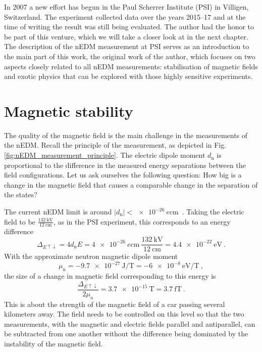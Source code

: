 In 2007 a new effort has begun in the Paul Scherrer Institute (PSI) in Villigen, Switzerland. The experiment collected data over the years 2015--17 and at the time of writing the result was still being evaluated. The author had the honor to be part of this venture, which we will take a closer look at in the next chapter. The description of the nEDM measurement at PSI serves as an introduction to the main part of this work, the original work of the author, which focuses on two aspects closely related to all nEDM measurements: stabilisation of magnetic fields and exotic physics that can be explored with those highly sensitive experiments.



\section{Magnetic stability}
The quality of the magnetic field is the main challenge in the measurements of the nEDM\@. Recall the principle of the measurement, as depicted in Fig.\,\ref{fig:nEDM_measurement_principle}. The electric dipole moment $d_\text{n}$ is proportional to the difference in the measured energy separations between the field configurations. Let us ask ourselves the following question: How big is a change in the magnetic field that causes a comparable change in the separation of the states?

The current nEDM limit is around $|d_\text{n}| < \SI{e-26}{\elementarycharge\centi\meter}$~\cite{PhysRevLett.97.131801}. Taking the electric field to be $\frac{ \SI{132}{\kilo\volt} }{ \SI{12}{\centi\meter} }$, as in the PSI experiment, this corresponds to an energy difference
\begin{equation}
  \Delta_{E\uparrow\downarrow} = 4 d_\text{n} E = \SI{4e-26}{\elementarycharge\centi\meter} \ \frac{ \SI{132}{\kilo\volt} }{ \SI{12}{\centi\meter} } = \SI{4.4e-22}{\electronvolt} \ .
\end{equation}
With the approximate neutron magnetic dipole moment~\cite{PDG2016}
\begin{equation}
  \mu_\text{n} = \SI{-9.7e-27}{\joule\per\tesla} = \SI{-6e-8}{\electronvolt\per\tesla} \ ,
\end{equation}
the size of a change in magnetic field corresponding to this energy is
\begin{equation}
  \frac{ \Delta_{E\uparrow\downarrow} }{2 \mu_n} = \SI{3.7e-15}{\tesla} = \SI{3.7}{\femto\tesla} \ .
\end{equation}
This is about the strength of the magnetic field of a car passing several kilometers away. The field needs to be controlled on this level so that the two measurements, with the magnetic and electric fields parallel and antiparallel, can be subtracted from one another without the difference being dominated by the instability of the magnetic field.

